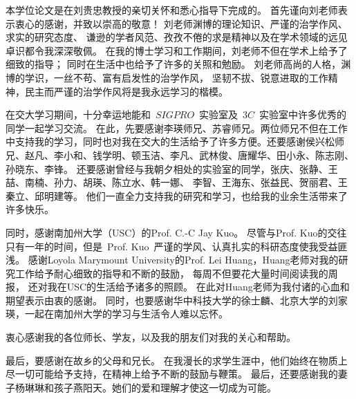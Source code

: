 \par 本学位论文是在刘贵忠教授的亲切关怀和悉心指导下完成的。 首先谨向刘老师表示衷心的感谢，并致以崇高的敬意！
刘老师渊博的理论知识、严谨的治学作风、求实的研究态度、
谦逊的学者风范、孜孜不倦的求是精神以及在学术领域的远见卓识都令我深深敬佩。
在我的博士学习和工作期间，刘老师不但在学术上给予了细致的指导； 同时在生活中也给予了许多的关照和勉励。
刘老师高尚的人格，渊博的学识，一丝不苟、富有启发性的治学作风，
坚韧不拔、锐意进取的工作精神，民主而严谨的治学作风将是我永远学习的楷模。

\par 在交大学习期间，十分幸运地能和~$SIGPRO$~实验室及~$3C$~实验室中许多优秀的同学一起学习交流。
在此，先要感谢李瑛师兄、苏睿师兄。两位师兄不但在工作中支持我的学习，同时也对我在交大的生活给予了许多方便。还要感谢侯兴松师兄、赵凡、李小和、钱学明、顿玉洁、李凡、武林俊、唐耀华、田小永、陈志刚、孙晓东、李锋。
还要感谢曾经与我朝夕相处的实验室的同学，张庆、张静、王喆、南楠、孙力、胡瑛、陈立水、韩一娜、
李智、王海东、张益民、贺丽君、王秦立、邱明建等。
他们一直全力支持我的研究和学习，也给我的业余生活带来了许多快乐。

\par 同时，感谢南加州大学（USC）的Prof. C.-C Jay Kuo。
尽管与Prof. Kuo的交往只有一年的时间，但是~Prof. Kuo~严谨的学风、认真扎实的科研态度使我受益匪浅。
感谢Loyola Marymount University的Prof. Lei Huang，Huang老师对我的研究工作给予耐心细致的指导和不断的鼓励，
每周不但要花大量时间阅读我的周报，
还对我在USC的生活给予诸多的照顾。
在此对Huang老师为我付诸的心血和期望表示由衷的感谢。
同时，也要感谢华中科技大学的徐士麟、北京大学的刘家瑛，一起在南加州大学的学习与生活令人难以忘怀。

\par 衷心感谢我的各位师长、学友，以及我的朋友们对我的关心和帮助。 
\par 最后，要感谢在故乡的父母和兄长。 在我漫长的求学生涯中，他们始终在物质上尽一切可能给予支持，在精神上给予不断的鼓励与鞭策。 最后，还要感谢我的妻子杨琳琳和孩子燕阳天。她们的爱和理解才使这一切成为可能。
